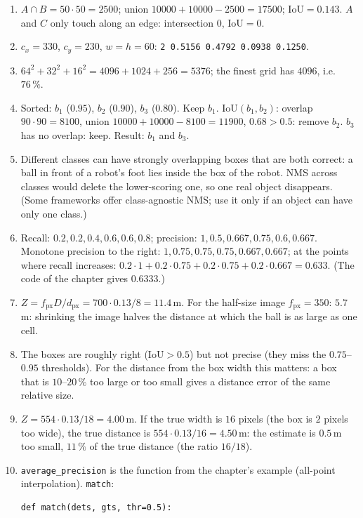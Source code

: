 \begin{enumerate}[label=\textbf{\ansnum.\arabic*}]
  \item $A\cap B=50\cdot50=2500$; union $10000+10000-2500=17500$; $\mathrm{IoU}=0.143$. $A$ and $C$ only touch along an edge: intersection $0$, $\mathrm{IoU}=0$.
  \item $c_x=330$, $c_y=230$, $w=h=60$: \texttt{2 0.5156 0.4792 0.0938 0.1250}.
  \item $64^2+32^2+16^2=4096+1024+256=5376$; the finest grid has $4096$, i.e.\ $76\,\%$.
  \item Sorted: $b_1$ ($0.95$), $b_2$ ($0.90$), $b_3$ ($0.80$). Keep $b_1$. $\mathrm{IoU}(b_1,b_2)$: overlap $90\cdot90=8100$, union $10000+10000-8100=11900$, $0.68>0.5$: remove $b_2$. $b_3$ has no overlap: keep. Result: $b_1$ and $b_3$.
  \item Different classes can have strongly overlapping boxes that are both correct: a ball in front of a robot's foot lies inside the box of the robot. NMS across classes would delete the lower-scoring one, so one real object disappears. (Some frameworks offer class-agnostic NMS; use it only if an object can have only one class.)
  \item Recall: $0.2,0.2,0.4,0.6,0.6,0.8$; precision: $1,0.5,0.667,0.75,0.6,0.667$. Monotone precision to the right: $1,0.75,0.75,0.75,0.667,0.667$; at the points where recall increases: $0.2\cdot1+0.2\cdot0.75+0.2\cdot0.75+0.2\cdot0.667=0.633$. (The code of the chapter gives $0.6333$.)
  \item $Z=f_\text{px}D/d_\text{px}=700\cdot0.13/8=11.4$\,m. For the half-size image $f_\text{px}=350$: $5.7$\,m: shrinking the image halves the distance at which the ball is as large as one cell.
  \item The boxes are roughly right ($\mathrm{IoU}>0.5$) but not precise (they miss the $0.75$--$0.95$ thresholds). For the distance from the box width this matters: a box that is $10$--$20\,\%$ too large or too small gives a distance error of the same relative size.
  \item $Z=554\cdot0.13/18=4.00$\,m. If the true width is $16$ pixels (the box is $2$ pixels too wide), the true distance is $554\cdot0.13/16=4.50$\,m: the estimate is $0.5$\,m too small, $11\,\%$ of the true distance (the ratio $16/18$).
  \item[\textbf{\ansnum.10}] \texttt{average\_precision} is the function from the chapter's example (all-point interpolation). \texttt{match}:
\begin{verbatim}
def match(dets, gts, thr=0.5):

\end{verbatim}
\end{enumerate}
